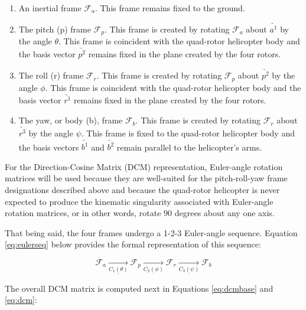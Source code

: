 \documentclass[journal]{IEEEtran}
\begin{document}
\begin{enumerate}
\item An inertial frame $\mathcal{F}_a$. This frame remains fixed to the ground. 
\item The pitch (p) frame $\mathcal{F}_p$. This frame is created by rotating $\mathcal{F}_a$ about $\underrightarrow{a^1}$ by the angle $\theta$. This frame is coincident with the quad-rotor helicopter body and the basis vector $\underrightarrow{p^2}$ remains fixed in the plane created by the four rotors.
\item The roll (r) frame $\mathcal{F}_r$. This frame is created by rotating $\mathcal{F}_p$ about $\underrightarrow{p^2}$ by the angle $\phi$. This frame is coincident with the quad-rotor helicopter body and the basis vector $\underrightarrow{r^1}$ remains fixed in the plane created by the four rotors.
\item The yaw, or body (b), frame $\mathcal{F}_b$. This frame is created by rotating $\mathcal{F}_r$ about $\underrightarrow{r^3}$ by the angle $\psi$. This frame is fixed to the quad-rotor helicopter body and the basis vectors $\underrightarrow{b^1}$ and $\underrightarrow{b^2}$ remain parallel to the helicopter's arms. 
\end{enumerate}

For the Direction-Cosine Matrix (DCM) representation, Euler-angle rotation matrices will be used because they are well-suited for the pitch-roll-yaw frame designations described above and because the quad-rotor helicopter is never expected to produce the kinematic singularity associated with Euler-angle rotation matrices, or in other words, rotate $90$ degrees about any one axis. 

That being said, the four frames undergo a 1-2-3 Euler-angle sequence. Equation \ref{eq:eulerseq} below provides the formal representation of this sequence:

\begin{equation}
	\mathcal{F}_a \xrightarrow[\underline{C_1(\theta)}]{} \mathcal{F}_p \xrightarrow[\underline{C_2(\phi)}]{} \mathcal{F}_r \xrightarrow[\underline{C_3(\psi)}]{} \mathcal{F}_b
	\label{eq:eulerseq}
\end{equation}

The overall DCM matrix is computed next in Equations \ref{eq:dcmbase} and \ref{eq:dcm}:
\end{document}
